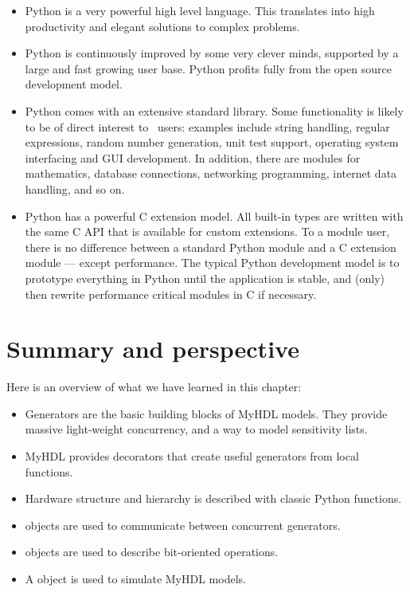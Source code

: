 \begin{itemize}

\item Python is a very powerful high level language. This translates
into high productivity and elegant solutions to complex problems.

\item  Python is continuously improved by some very clever 
minds, supported by a large and fast growing user base. Python profits
fully from the open source development model.

\item Python comes with an extensive standard library. Some
functionality is likely to be of direct interest to \myhdl\ users:
examples include string handling, regular expressions, random number
generation, unit test support, operating system interfacing and GUI
development. In addition, there are modules for mathematics, database
connections, networking programming, internet data handling, and so
on.

\item Python has a powerful C extension model. All built-in types are
written with the same C API that is available for custom
extensions. To a module user, there is no difference between a
standard Python module and a C extension module --- except
performance. The typical Python development model is to prototype
everything in Python until the application is stable, and (only) then
rewrite performance critical modules in C if necessary.

\end{itemize}


\section{Summary and perspective}
Here is an overview of what we have learned in this chapter:

\begin{itemize}
\item Generators are the basic building blocks of MyHDL models. They
provide massive light-weight concurrency, and a way to model sensitivity lists.

\item MyHDL provides decorators that create useful generators from local functions.

\item Hardware structure and hierarchy is described with classic Python functions. 

\item {} objects are used to communicate between concurrent generators.

\item {} objects are used to describe bit-oriented operations.

\item A  object is used to simulate MyHDL models.
\end{itemize}

